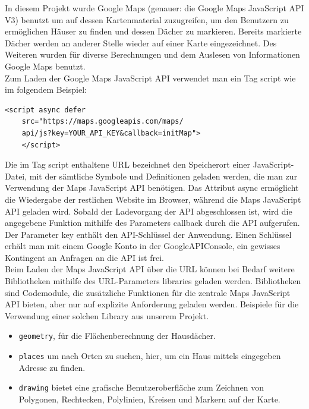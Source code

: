 \documentclass[12pt,a4paper]{article}
\begin{document}
In diesem Projekt wurde Google Maps (genauer: die Google Maps JavaScript API V3) benutzt um auf dessen Kartenmaterial zuzugreifen, um den Benutzern zu ermöglichen Häuser zu finden und dessen Dächer zu markieren. Bereits markierte Dächer werden an anderer Stelle wieder auf einer Karte eingezeichnet. Des Weiteren wurden für diverse Berechnungen und dem Auslesen von Informationen Google Maps benutzt.\\


Zum Laden der Google Maps JavaScript API verwendet man ein Tag script wie im folgendem Beispiel:
\pagebreak
    \begin{lstlisting}[basicstyle=\ttfamily,
  columns=fullflexible,
  frame=single,
  breaklines=true,
  postbreak=\mbox{\textcolor{red}{$\hookrightarrow$}\space}]
<script async defer 
    src="https://maps.googleapis.com/maps/
    api/js?key=YOUR_API_KEY&callback=initMap">
    </script>
\end{lstlisting}
\bigskip
\bigskip

Die im Tag script enthaltene URL bezeichnet den Speicherort einer JavaScript-Datei, mit der sämtliche Symbole und Definitionen geladen werden, die man zur Verwendung der Maps JavaScript API benötigen. Das Attribut async ermöglicht die Wiedergabe der restlichen Website im Browser, während die Maps JavaScript API geladen wird. Sobald der Ladevorgang der API abgeschlossen ist, wird die angegebene Funktion mithilfe des Parameters callback durch die API aufgerufen. Der Parameter key enthält den API-Schlüssel der Anwendung. Einen Schlüssel erhält man mit einem Google Konto in der GoogleAPIConsole, ein gewisses Kontingent an Anfragen an die API ist frei.\\

Beim Laden der Maps JavaScript API über die URL können bei Bedarf weitere Bibliotheken mithilfe des URL-Parameters libraries geladen werden. Bibliotheken sind Codemodule, die zusätzliche Funktionen für die zentrale Maps JavaScript API bieten, aber nur auf explizite Anforderung geladen werden.
Beispiele für die Verwendung einer solchen Library aus unserem Projekt.
\begin{itemize}
	\item \texttt{geometry}, für die Flächenberechnung der Hausdächer.
	\item \texttt{places} um nach Orten zu suchen, hier, um ein Haus mittels eingegeben Adresse zu finden.
	\item \texttt{drawing} bietet eine grafische Benutzeroberfläche zum Zeichnen von Polygonen, Rechtecken, Polylinien, Kreisen und Markern auf der Karte. 

\end{itemize}
\end{document}
